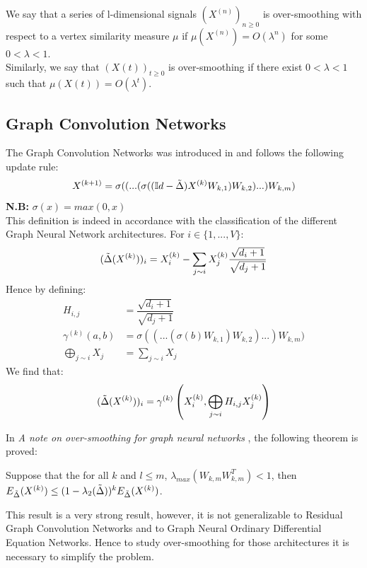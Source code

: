 \documentclass[12pt]{article}
\begin{document}
\begin{definition}
    We say that a series of l-dimensional signals $(X^{(n)})_{n \geq 0}$ is over-smoothing with respect to a vertex similarity measure $\mu$ if $\mu(X^{(n)}) = O(\lambda^n)$ for some $0 < \lambda < 1$.\\

    Similarly, we say that $(X(t))_{t \geq 0}$ is over-smoothing if there exist $0 < \lambda < 1$ such that $\mu(X(t)) = O(\lambda^t)$.
\end{definition}

\subsection{Graph Convolution Networks}
The Graph Convolution Networks was introduced in  and follows the following update rule:
$$
X^{(k+1)} = \sigma((...(\sigma((\mathbb{I}d -\Tilde{\Delta}) X^{(k)} W_{k,1})W_{k,2})...)W_{k,m})
$$
\textbf{N.B:} $\sigma(x) = max(0,x)$\\

This definition is indeed in accordance with the classification of the different Graph Neural Network architectures. For $i \in \{1,...,V\}$:
$$
(\Tilde{\Delta}(X^{(k)}))_i = X^{(k)}_i - \sum_{j \sim i} X^{(k)}_j \frac{\sqrt{d_i +1}}{\sqrt{d_j +1}}
$$
Hence by defining:
\begin{align*}
    H_{i,j} &= \dfrac{\sqrt{d_i+1}}{\sqrt{d_j + 1}} \\
    \gamma^{(k)}(a,b) &= \sigma((...(\sigma(b) W_{k,1})W_{k,2})...)W_{k,m})\\
    \bigoplus_{j \sim i} X_j &= \sum_{j \sim i} X_j
\end{align*}
We find that:
$$
(\Tilde{\Delta}(X^{(k)}))_i = \gamma^{(k)}\left(X_i^{(k)}, \bigoplus_{j \sim i} H_{i,j} X_j^{(k)} \right)
$$

In \textit{A note on over-smoothing for graph neural networks} , the following theorem is proved:

\begin{thm}\label{gcnoversmoothing}
    Suppose that the for all $k$ and $l \leq m$, $\lambda_{max}(W_{k,m}W_{k,m}^T) < 1$, then $E_{\Tilde{\Delta}}(X^{(k)}) \leq (1-\lambda_2(\Tilde{\Delta}))^kE_{\Tilde{\Delta}}(X^{(k)})$.
\end{thm}

This result is a very strong result, however, it is not generalizable to Residual Graph Convolution Networks and to Graph Neural Ordinary Differential Equation Networks. Hence to study over-smoothing for those architectures it is necessary to simplify the problem.\\
\end{document}
